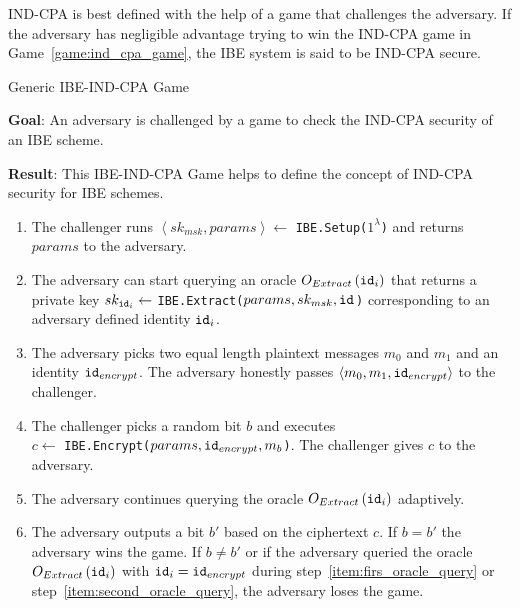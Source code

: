 IND-CPA is best defined with the help of a game that challenges the adversary. If the adversary has negligible advantage trying to win the IND-CPA game in Game~\ref{game:ind_cpa_game}, the IBE system is said to be IND-CPA secure.

\begin{game}
\caption{Generic IBE-IND-CPA Game~\cite{thesis:Alfredo08}}
\label{game:ind_cpa_game}
\begin{description}
 \item \textbf{Goal}: An adversary is challenged by a game to check the IND-CPA security of an IBE scheme.
 
 \item \textbf{Result}: This IBE-IND-CPA Game helps to define the concept of IND-CPA security for IBE schemes.
\end{description}

 \begin{enumerate}
  \item The challenger runs $\left< sk_{msk}, params\right> \leftarrow$ \texttt{IBE.Setup($1^{\lambda}$)} and returns $params$ to the adversary.
  \item \label{item:firs_oracle_query} The adversary can start querying an oracle $O_{Extract} \left( \mathtt{id}_{i} \right)$ that returns a private key $sk_{\mathtt{id}_{i}} \leftarrow$ \texttt{IBE.Extract($params, sk_{msk}, \mathtt{id}_{}$)} corresponding to an adversary defined identity $\mathtt{id}_{i}$.
  \item The adversary picks two equal length plaintext messages $m_0$ and $m_1$ and an identity $\mathtt{id}_{encrypt}$. The adversary honestly passes $\left< m_0, m_1, \mathtt{id}_{encrypt} \right>$ to the challenger.
  \item The challenger picks a random bit $b$ and executes \\ $c \leftarrow$ \texttt{IBE.Encrypt($params, \mathtt{id}_{encrypt}, m_b$)}. The challenger gives $c$ to the adversary.
  \item \label{item:second_oracle_query} The adversary continues querying the oracle $O_{Extract} \left( \mathtt{id}_{i} \right)$ adaptively.
  \item The adversary outputs a bit $b'$ based on the ciphertext $c$. If $b = b'$ the adversary wins the game. If $b \neq b'$ or if the adversary queried the oracle $O_{Extract} \left( \mathtt{id}_{i} \right)$ with $\mathtt{id}_{i} = \mathtt{id}_{encrypt}$ during step~\ref{item:firs_oracle_query} or step~\ref{item:second_oracle_query}, the adversary loses the game.
 \end{enumerate}
\end{game}

